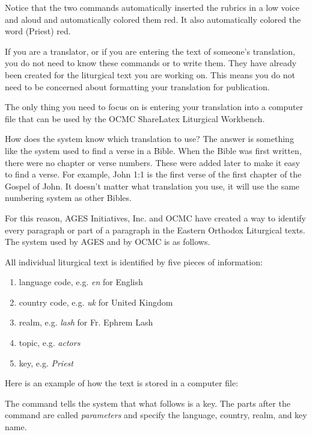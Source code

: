\documentclass[]{memoir}
\def\ltOcmcSystem{OCMC ShareLatex Liturgical Workbench}
\newcommand{\ltDocCommand}[2]{%
\color{blue}{\textbackslash #1#2} \color{black}
}
\newenvironment{ltDocBlock}{
\color{blue}\verbatim
}
{ 
\endverbatim
\color{black}
}
\begin{document}
Notice that the two commands automatically inserted the rubrics \color{red}in a low voice \color{black}and \color{red}aloud \color{black} and automatically colored them red.  It also automatically colored the word \color{red}(Priest) \color{black}red.

If you are a translator, or if you are entering the text of someone's translation, you do not need to know these commands or to write them.  They have already been created for the liturgical text you are working on.  This means you do not need to be concerned about formatting your translation for publication.

The only thing you need to focus on is entering your translation into a computer file that can be used by the \ltOcmcSystem.

How does the system know which translation to use?  The answer is something like the system used to find a verse in a Bible.  When the Bible was first written, there were no chapter or verse numbers.  These were added later to make it easy to find a verse.  For example, John 1:1 is the first verse of the first chapter of the Gospel of John.  It doesn't matter what translation you use, it will use the same numbering system as other Bibles.

For this reason, AGES Initiatives, Inc. and OCMC have created a way to identify every paragraph or part of a paragraph in the Eastern Orthodox Liturgical texts.  The system used by AGES and by OCMC is as follows.

All individual liturgical text is identified by five pieces of information:

\begin{enumerate}
    \item language code, e.g. \emph{en} for English
    \item country code, e.g. \emph{uk} for United Kingdom
    \item realm, e.g. \emph{lash} for Fr. Ephrem Lash
    \item topic, e.g. \emph{actors}
    \item key, e.g. \emph{Priest}
\end{enumerate}

Here is an example of how the text is stored in a computer file:
\begin{ltDocBlock}
%
\end{ltDocBlock}

The command \ltDocCommand{ltKey}{}tells the system that what follows is a key.  The parts after the command are called \emph{parameters} and specify the language, country, realm, and key name.
\end{document}
